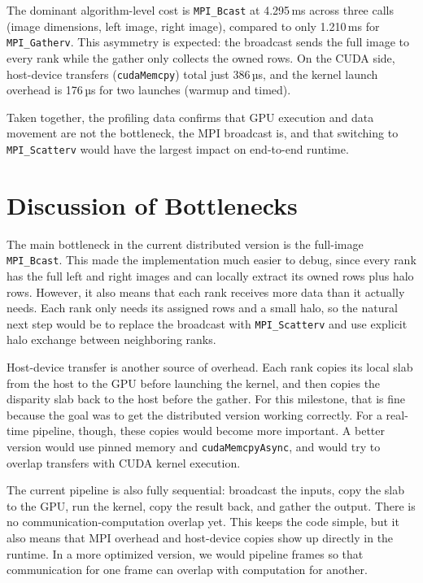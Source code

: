 \documentclass[11pt]{article}
\begin{document}
The dominant algorithm-level cost is \texttt{MPI\_Bcast} at 4.295\,ms across
three calls (image dimensions, left image, right image), compared to only
1.210\,ms for \texttt{MPI\_Gatherv}. This asymmetry is expected: the broadcast
sends the full image to every rank while the gather only collects the owned rows.
On the CUDA side, host-device transfers (\texttt{cudaMemcpy}) total just 386\,µs,
and the kernel launch overhead is 176\,µs for two launches (warmup and timed).

Taken together, the profiling data confirms that GPU execution and data movement
are not the bottleneck, the MPI broadcast is, and that switching to
\texttt{MPI\_Scatterv} would have the largest impact on end-to-end runtime.

\section{Discussion of Bottlenecks}

The main bottleneck in the current distributed version is the full-image
\texttt{MPI\_Bcast}. This made the implementation much easier to debug, since every
rank has the full left and right images and can locally extract its owned rows plus
halo rows. However, it also means that each rank receives more data than it actually
needs. Each rank only needs its assigned rows and a small halo, so the natural next
step would be to replace the broadcast with \texttt{MPI\_Scatterv} and use explicit
halo exchange between neighboring ranks.

Host-device transfer is another source of overhead. Each rank copies its local slab
from the host to the GPU before launching the kernel, and then copies the disparity
slab back to the host before the gather. For this milestone, that is fine because the
goal was to get the distributed version working correctly. For a real-time pipeline,
though, these copies would become more important. A better version would use pinned
memory and \texttt{cudaMemcpyAsync}, and would try to overlap transfers with CUDA
kernel execution.

The current pipeline is also fully sequential: broadcast the inputs, copy the slab to
the GPU, run the kernel, copy the result back, and gather the output. There is no
communication-computation overlap yet. This keeps the code simple, but it also means
that MPI overhead and host-device copies show up directly in the runtime. In a more
optimized version, we would pipeline frames so that communication for one frame can
overlap with computation for another.
\end{document}
